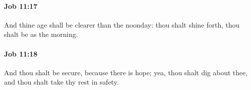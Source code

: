 		\paragraph{Job 11:17} %
			\label{JOB-11-17}

			And thine age shall be clearer than the noonday: thou shalt shine forth, thou shalt be as the morning.


		\paragraph{Job 11:18} %
			\label{JOB-11-18}

			And thou shalt be secure, because there is hope; yea, thou shalt dig about thee, and thou shalt take thy rest in safety.


